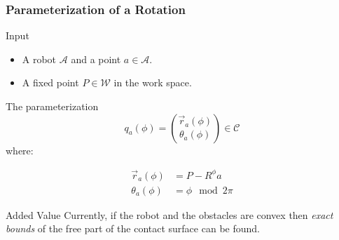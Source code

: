 \documentclass[ucs,9pt,pagenumbersfull]{beamer}
\begin{document}
\begin{frame}
  \frametitle{Parameterization of a Rotation}
  \begin{block}{Input}
    \begin{itemize}
    \item A robot \(\mathcal{A}\) and a point \(a\in\mathcal{A}\).
    \item A fixed point \(P \in \mathcal{W}\) in the work space.
    \end{itemize}
  \end{block}

  \begin{minipage}{0.45\linewidth}
    \begin{block}{The parameterization}
      \[
      q_a(\phi) = \binom{\vec{r}_a(\phi)}{\theta_a(\phi)} \in
      \mathcal{C}
      \]
      where:

    \begin{align*}
      \vec{r}_a(\phi) & =  P- R^{\phi} a\\
      \theta_a(\phi) & = \phi \mod 2\pi
    \end{align*}
  \end{block}
\end{minipage}
\hfill
\begin{minipage}{0.45\linewidth}
  \begin{block}{Added Value}
    Currently, if the robot and the obstacles are convex then \emph{exact
    bounds} of the free part of the contact surface can be found.
  \end{block}
\end{minipage}
\end{frame}
\end{document}
